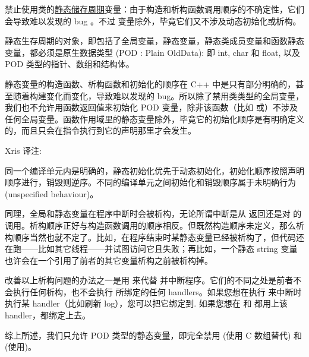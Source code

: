 
禁止使用类的\href{http://zh.cppreference.com/w/cpp/language/storage_duration#.E5.AD.98.E5.82.A8.E6.9C.9F}{静态储存周期}变量：由于构造和析构函数调用顺序的不确定性，它们会导致难以发现的 bug 。不过 变量除外，毕竟它们又不涉及动态初始化或析构。

静态生存周期的对象，即包括了全局变量，静态变量，静态类成员变量和函数静态变量，都必须是原生数据类型 (POD : Plain OldData): 即 int, char 和 float, 以及 POD 类型的指针、数组和结构体。

静态变量的构造函数、析构函数和初始化的顺序在 C++ 中是只有部分明确的，甚至随着构建变化而变化，导致难以发现的 bug。所以除了禁用类类型的全局变量，我们也不允许用函数返回值来初始化 POD 变量，除非该函数（比如  或）不涉及任何全局变量。函数作用域里的静态变量除外，毕竟它的初始化顺序是有明确定义的，而且只会在指令执行到它的声明那里才会发生。

\begin{DNote}
  Xris 译注:

  同一个编译单元内是明确的，静态初始化优先于动态初始化，初始化顺序按照声明顺序进行，销毁则逆序。不同的编译单元之间初始化和销毁顺序属于未明确行为
  (unspecified behaviour)。

\end{DNote}

同理，全局和静态变量在程序中断时会被析构，无论所谓中断是从  返回还是对  的调用。析构顺序正好与构造函数调用的顺序相反。但既然构造顺序未定义，那么析构顺序当然也就不定了。比如，在程序结束时某静态变量已经被析构了，但代码还在跑——比如其它线程——并试图访问它且失败；再比如，一个静态 string 变量也许会在一个引用了前者的其它变量析构之前被析构掉。

改善以上析构问题的办法之一是用  来代替 并中断程序。它们的不同之处是前者不会执行任何析构，也不会执行  所绑定的任何 handlers。如果您想在执行  来中断时执行某 handler（比如刷新 log），您可以把它绑定到. 如果您想在  和  都用上该 handler，都绑定上去。

综上所述，我们只允许 POD 类型的静态变量，即完全禁用  (使用 C 数组替代) 和  (使用)。

